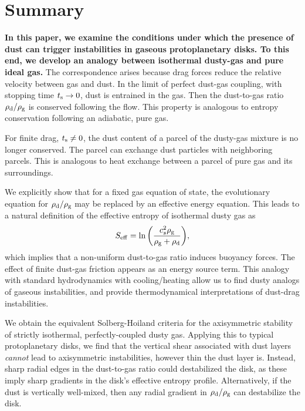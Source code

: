 \section{Summary}\label{summary}
{\bf
In this paper, we examine the conditions under which the presence of
dust can trigger instabilities in gaseous protoplanetary disks.  To this end, 
we develop an analogy between isothermal  dusty-gas and pure ideal
gas. 
} 
The correspondence arises
because drag forces reduce the relative velocity between gas and
dust. In the limit of perfect dust-gas coupling, with stopping time $t_\mathrm{s} \to 0$,  
 dust is entrained in 
the gas. Then the dust-to-gas ratio $\rho_\mathrm{d}/\rho_\mathrm{g}$ is conserved
following the flow. This property is analogous to entropy conservation 
following an adiabatic, pure gas. 

For finite drag, $t_\mathrm{s}\neq 0$, the dust content of a 
parcel of the dusty-gas mixture is no longer conserved. The parcel 
can exchange dust particles with neighboring parcels. %
This is analogous to heat exchange between a parcel of pure gas and
its surroundings.    

We explicitly show that for a fixed gas equation of state, the  
evolutionary equation for $\rho_\mathrm{d}/\rho_\mathrm{g}$ may be replaced by an 
effective energy equation. This leads to a 
natural definition of the effective entropy of isothermal dusty gas as  
\begin{align*}
  S_\mathrm{eff}  = \ln{\left(\frac{c_s^2\rho_\mathrm{g}}{\rho_\mathrm{g}+\rho_\mathrm{d}}\right)},  
\end{align*}
which implies that a non-uniform dust-to-gas ratio induces buoyancy forces.  
The effect of finite dust-gas friction appears as an energy
source term.  This analogy with standard  
hydrodynamics with cooling/heating allow us to find dusty analogs of gaseous
instabilities, and provide thermodynamical interpretations of  
dust-drag instabilities. 


We obtain the equivalent Solberg-Hoiland criteria for the 
axisymmetric stability of strictly isothermal, perfectly-coupled dusty gas.  
Applying this to typical protoplanetary disks, we find that 
the vertical shear associated with dust 
 layers \emph{cannot} lead to axisymmetric  
  instabilities, however thin the dust layer is.    
Instead, sharp radial  edges in the dust-to-gas ratio could destabilized the
disk, as these imply sharp gradients in the disk's effective entropy
profile. Alternatively, if the dust is vertically well-mixed, then any
radial gradient in $\rho_\mathrm{d}/\rho_\mathrm{g}$ can destabilize the disk. 

